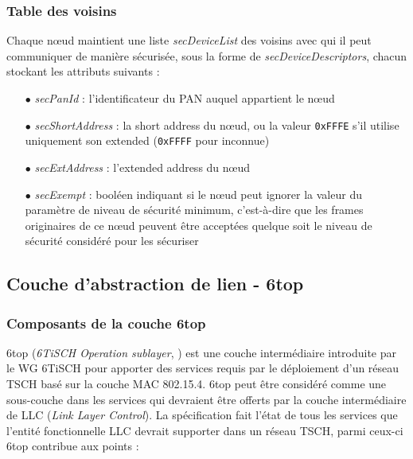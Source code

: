 \documentclass[]{report}
\begin{document}
\subsubsection{Table des voisins}
\label{neighbors_table}

Chaque nœud maintient une liste \textit{secDeviceList} des voisins avec qui il peut communiquer de manière sécurisée, sous la forme de \textit{secDeviceDescriptors}, chacun stockant les attributs suivants :
\vspace{0.2cm}
\begin{itemize}
\item[$\bullet$] \textit{secPanId} : l'identificateur du PAN auquel appartient le nœud
\vspace{0.1cm}
\item[$\bullet$] \textit{secShortAddress} : la short address du nœud, ou la valeur \texttt{0xFFFE} s'il utilise uniquement son extended (\texttt{0xFFFF} pour inconnue)
\vspace{0.1cm}
\item[$\bullet$] \textit{secExtAddress} : l'extended address du nœud
\vspace{0.1cm}
\item[$\bullet$] \textit{secExempt} : booléen indiquant si le nœud peut ignorer la valeur du paramètre de niveau de sécurité minimum, c'est-à-dire que les frames originaires de ce nœud peuvent être acceptées quelque soit le niveau de sécurité considéré pour les sécuriser
\vspace{0.1cm}

\end{itemize}

\newpage

	\subsection{Couche d'abstraction de lien - 6top}
	\label{6top}

\subsubsection{Composants de la couche 6top}

\par 6top (\textit{6TiSCH Operation sublayer}, \cite{rfc8480}) est une couche intermédiaire introduite par le WG 6TiSCH pour apporter des services requis par le déploiement d'un réseau TSCH basé sur la couche MAC 802.15.4. 6top peut être considéré comme une sous-couche dans les services qui devraient être offerts par la couche intermédiaire de LLC (\textit{Link Layer Control}). La spécification \cite{rfc7554} fait l'état de tous les services que l'entité fonctionnelle LLC devrait supporter dans un réseau TSCH, parmi ceux-ci 6top contribue aux points :
\end{document}
